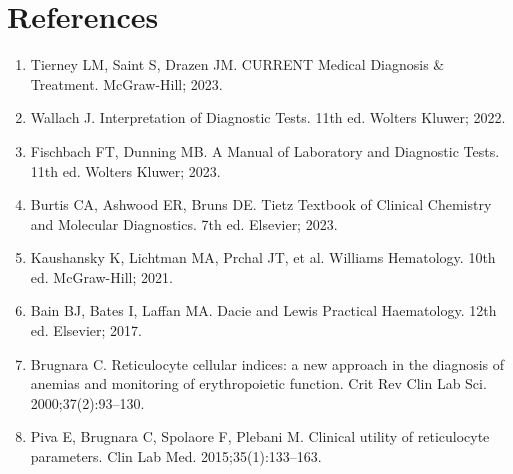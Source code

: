 \section*{References}
\begin{enumerate}
  \item Tierney LM, Saint S, Drazen JM. CURRENT Medical Diagnosis \& Treatment. McGraw-Hill; 2023.
  \item Wallach J. Interpretation of Diagnostic Tests. 11th ed. Wolters Kluwer; 2022.
  \item Fischbach FT, Dunning MB. A Manual of Laboratory and Diagnostic Tests. 11th ed. Wolters Kluwer; 2023.
  \item Burtis CA, Ashwood ER, Bruns DE. Tietz Textbook of Clinical Chemistry and Molecular Diagnostics. 7th ed. Elsevier; 2023.
  \item Kaushansky K, Lichtman MA, Prchal JT, et al. Williams Hematology. 10th ed. McGraw-Hill; 2021.
  \item Bain BJ, Bates I, Laffan MA. Dacie and Lewis Practical Haematology. 12th ed. Elsevier; 2017.
  \item Brugnara C. Reticulocyte cellular indices: a new approach in the diagnosis of anemias and monitoring of erythropoietic function. Crit Rev Clin Lab Sci. 2000;37(2):93--130.
  \item Piva E, Brugnara C, Spolaore F, Plebani M. Clinical utility of reticulocyte parameters. Clin Lab Med. 2015;35(1):133--163.
\end{enumerate}

\clearpage
